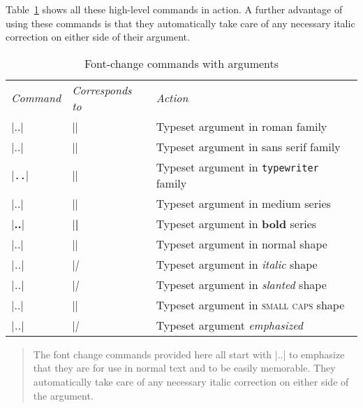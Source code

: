  Table~\ref{tab:fontcmds} shows all these high-level commands in
 action.  A further advantage of using these commands is that they
 automatically take care of any necessary italic correction on either
 side of their argument.
 \begin{table}[htbp]
 \begin{center}
 \caption{Font-change commands with arguments}
 \label{tab:fontcmds}
 \begin{tabular}{lll}
 \textit{Command} & \textit{Corresponds to }& \textit{Action} \\[4pt]
 |\textrm{..}| & |\rmfamily| &
            Typeset argument in roman family  \\
 |\textsf{..}| & |\sffamily| &
            Typeset argument in \textsf{sans serif} family  \\
 |\texttt{..}| & |\ttfamily| &
            Typeset argument in \texttt{typewriter} family
                                                            \\[2pt]
 |\textmd{..}| & |\mdseries| &
             Typeset argument in medium series    \\
 |\textbf{..}| & |\bfseries| &
             Typeset argument in \textbf{bold} series    \\[2pt]
 |\textup{..}| & |\upshape| &
             Typeset argument in normal shape  \\
 |\textit{..}| & |\itshape| &
             Typeset argument in \textit{italic} shape  \\
 |\textsl{..}| & |\slshape| &
             Typeset argument in \textsl{slanted} shape  \\
 |\textsc{..}| & |\scshape| &
             Typeset argument in \textsc{small caps} shape
                                                            \\[2pt]
 |\emph{..}| & |\em| &
              Typeset argument \emph{emphasized}
 \end{tabular}
 \end{center}
 
 \begin{quote}
 The font change commands provided here
 all start with |\text..| to emphasize that they
 are for use in normal text and to be easily memorable. They
 automatically take care of any necessary italic correction on either
 side of the argument.
 \end{quote}
 \end{table}

